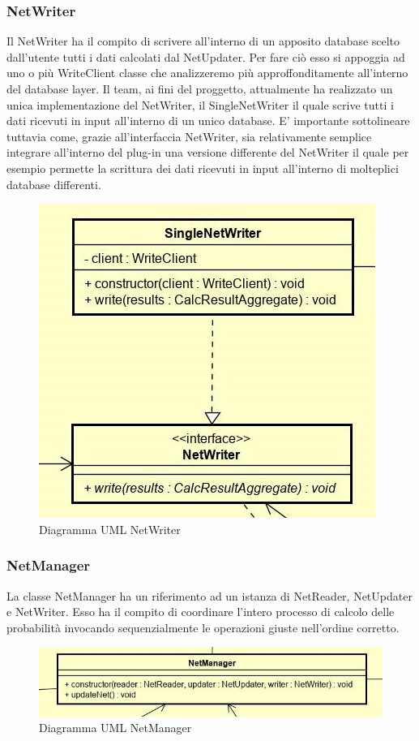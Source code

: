 \subsubsection{NetWriter}
Il NetWriter ha il compito di scrivere all'interno di un apposito database scelto dall'utente tutti i dati calcolati dal NetUpdater. Per fare ciò esso si appoggia ad uno o più WriteClient classe che analizzeremo più approffonditamente all'interno del database layer.
Il team, ai fini del proggetto, attualmente ha realizzato un unica implementazione del NetWriter, il SingleNetWriter il quale scrive tutti i dati ricevuti in input all'interno di un unico database. 
E' importante sottolineare tuttavia come, grazie all'interfaccia NetWriter, sia relativamente semplice integrare all'interno del plug-in una versione differente del NetWriter il quale per esempio permette la scrittura dei dati ricevuti in input all'interno di molteplici database differenti.
\begin{figure} [H]
	\centering
	\includegraphics[scale=1]{Img/NetWriter}
	\caption{Diagramma UML NetWriter}\label{}
\end{figure}
\subsubsection{NetManager}
La classe NetManager ha un riferimento ad un istanza di NetReader, NetUpdater e NetWriter. Esso ha il compito di coordinare l'intero processo di calcolo delle probabilità invocando sequenzialmente le operazioni giuste nell'ordine corretto.
\begin{figure} [H]
	\centering
	\includegraphics[scale=0.8]{Img/NetManager}
	\caption{Diagramma UML NetManager}\label{}
\end{figure}
